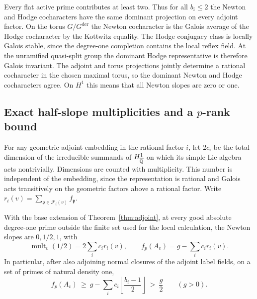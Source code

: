 Every flat active prime contributes at least two. Thus for all
\(b_i\le2\) the Newton and Hodge cocharacters have the same dominant
projection on every adjoint factor. On the torus \(G/G^{\mathrm{der}}\)
the Newton cocharacter is the Galois average of the Hodge cocharacter
by the Kottwitz equality. The Hodge conjugacy class is locally Galois
stable, since the degree-one completion contains the local reflex
field. At the unramified quasi-split group the dominant Hodge
representative is therefore Galois invariant. The adjoint and torus
projections jointly determine a rational cocharacter in the chosen
maximal torus, so the dominant Newton and Hodge cocharacters agree.
On \(H^1\) this means that all Newton slopes are zero or one.

\subsection{Exact half-slope multiplicities and a \texorpdfstring{\(p\)}{p}-rank bound}

For any geometric adjoint embedding in the rational factor \(i\),
let \(2c_i\) be the total dimension of the irreducible summands of
\(H^1_{\overline{\mathbb Q}}\) on which its simple Lie algebra acts nontrivially.
Dimensions are counted with multiplicity. This number is independent
of the embedding, since the representation is rational and Galois
acts transitively on the geometric factors above a rational factor.
Write \(r_i(v)=\sum_{\mathfrak p\in\mathcal F_i(v)}f_{\mathfrak p}\).

\begin{proposition}
\label{prop:adjoint-prank}
With the base extension of Theorem~\ref{thm:adjoint}, at every good
absolute degree-one prime outside the finite set used for the local
calculation, the Newton slopes are \(0,1/2,1\), with
\[
 \operatorname{mult}_v(1/2)=2\sum_i c_i r_i(v),\qquad
 f_p(A_v)=g-\sum_i c_i r_i(v).
\]
In particular, after also adjoining normal closures of the adjoint
label fields, on a set of primes of natural density one,
\[
 f_p(A_v)\ \ge\ g-\sum_i c_i\left\lfloor\frac{b_i-1}{2}\right\rfloor
 \ >\ \frac g2 \qquad (g>0).
\]
\end{proposition}

